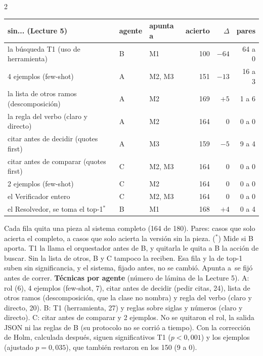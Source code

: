 \documentclass[9pt,a4paper]{extarticle}
\newcommand{\q}{\textquotedbl}
\begin{document}
\begin{multicols}{2}
{\footnotesize
\begin{tabular}{@{}lllrrr@{}}
\toprule
sin... (Lecture 5)                      & agente & apunta a & acierto & $\Delta$ & pares \\
\midrule
la búsqueda T1 (uso de herramienta)     & B & M1     & 100 & $-64$ & 64 a 0 \\
4 ejemplos (few-shot)                   & A & M2, M3 & 151 & $-13$ & 16 a 3 \\
la lista de otros ramos (descomposición) & A & M2     & 169 &  $+5$ &  1 a 6 \\
la regla del verbo (claro y directo)    & A & M2     & 164 &   $0$ &  0 a 0 \\
citar antes de decidir (quotes first)   & A & M3     & 159 &  $-5$ &  9 a 4 \\
citar antes de comparar (quotes first)  & C & M2, M3 & 164 &   $0$ &  0 a 0 \\
2 ejemplos (few-shot)                   & C & M2     & 164 &   $0$ &  0 a 0 \\
el Verificador entero                   & C & M2, M3 & 164 &   $0$ &  0 a 0 \\
el Resolvedor, se toma el top-1$^{*}$   & B & M1     & 168 &  $+4$ &  0 a 4 \\
\bottomrule
\end{tabular}\par}

\vspace{0.6mm}
{\footnotesize
Cada fila quita una pieza al sistema completo (164 de 180). \q Pares\q: casos que solo acierta
el completo, a casos que solo acierta la versión sin la pieza. ($^{*}$) Mide si B aporta. T1
la llama el orquestador antes de B, y quitarla le quita a B la acción de buscar. Sin la lista de
otros, B y C tampoco la reciben. Esa fila y la de top-1 suben sin significancia, y el sistema,
fijado antes, no se cambió.
\q Apunta a\q\ se fijó antes de correr. \textbf{Técnicas por agente} (número de lámina de la Lecture 5).
A: rol (6), 4 ejemplos (few-shot, 7), citar antes de decidir (pedir citas, 24), lista de otros
ramos (descomposición, que la clase no nombra) y regla del verbo (claro y directo, 20). B: T1
(herramienta, 27) y reglas sobre siglas y números (claro y directo). C: citar antes de comparar
y 2 ejemplos. No se quitaron el rol, la salida JSON ni las reglas de B (su protocolo no se corrió a tiempo). Con la corrección de
Holm, calculada después, siguen significativos T1 ($p<0{,}001$) y los ejemplos (ajustado
$p=0{,}035$), que también restaron en los 150 (9 a 0).

}
\end{multicols}
\end{document}
